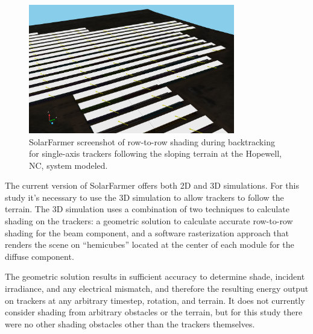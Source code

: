 \documentclass[conference]{IEEEtran}
\begin{document}
\begin{figure}[htbp]
\centerline{\includegraphics[width=9cm]{terrain-shadows-backtracking-hopewell.png}}
\caption{SolarFarmer screenshot of row-to-row shading during backtracking for single-axis trackers following the sloping terrain at the Hopewell, NC, system modeled.}
\label{terrain-shade}
\end{figure}

The current version of SolarFarmer offers both 2D and 3D simulations. For this study it’s necessary to use the 3D simulation to allow trackers to follow the terrain. The 3D simulation uses a combination of two techniques to calculate shading on the trackers: a geometric solution to calculate accurate row-to-row shading for the beam component, and a software rasterization approach that renders the scene on “hemicubes” located at the center of each module for the diffuse component. 

The geometric solution results in sufficient accuracy to determine shade, incident irradiance, and any electrical mismatch, and therefore the resulting energy output on trackers at any arbitrary timestep, rotation, and terrain. It does not currently consider shading from arbitrary obstacles or the terrain, but for this study there were no other shading obstacles other than the trackers themselves.
\end{document}
